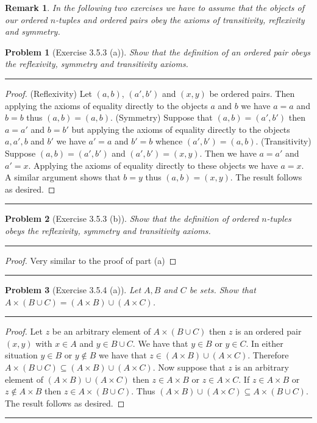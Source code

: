 \documentclass{article}
\newcommand{\lined}{\noindent\rule{\textwidth}{1pt}}
\newtheorem*{problem}{Problem}
\newtheorem*{remark}{Remark}
\begin{document}
	\newpage
	
	\begin{remark}
		In the following two exercises we have to assume that the objects of our ordered $n$-tuples and ordered pairs
		obey the axioms of transitivity, reflexivity and symmetry.  
	\end{remark}
	
	\begin{problem}[Exercise 3.5.3 (a)]
		Show that the definition of an ordered pair obeys the reflexivity, symmetry and transitivity axioms.
	\end{problem}
	
	\lined
	\begin{proof}
		(Reflexivity) Let $(a,b)$, $(a',b')$ and $(x,y)$ be ordered pairs. Then applying the axioms of equality directly to the objects $a$ and $b$ we have $a = a$ and $b = b$ thus $(a,b) = (a,b)$. (Symmetry) Suppose that $(a,b) = (a',b')$ then $a = a'$ and $b = b'$ but applying the axioms of equality directly to the objects $a,a',b$ and $b'$ we have $a' = a$ and $b' = b$ whence 
		$(a',b') = (a,b)$. (Transitivity) Suppose $(a,b) = (a',b')$ and $(a',b') = (x,y)$. Then we have $a = a'$ and $a' = x$. Applying the axioms of equality directly to these objects we have $a = x$. A similar argument shows that $b = y$ thus $(a,b) = (x,y)$. The result follows as desired.
		
	\end{proof}
	\lined
	
	\newpage
	
	\begin{problem}[Exercise 3.5.3 (b)]
		Show that the definition of ordered $n$-tuples obeys the reflexivity, symmetry and transitivity axioms.
	\end{problem}
	
	\lined
	\begin{proof}
		Very similar to the proof of part (a)
	\end{proof}
	\lined
	
	\newpage
	
	\begin{problem}[Exercise 3.5.4 (a)]
		Let $A,B$ and $C$ be sets. Show that $A \times (B \cup C) = (A \times B) \cup (A \times C)$.
	\end{problem}
	
	\lined
	\begin{proof}
		Let $z$ be an arbitrary element of $A \times (B \cup C)$ then $z$ is an ordered pair $(x,y)$ with $x \in A$ and 
		$y \in B \cup C$. We have that $y \in B$ or $y \in C$. In either situation $y \in B$ or $y \notin B$ we have that $z \in 
		(A \times B) \cup (A \times C)$. Therefore $A \times (B \cup C) \subseteq (A \times B) \cup (A \times C)$. Now suppose that $z$ is an arbitrary element of  $(A \times B) \cup (A \times C)$ then $z \in A \times B$ or $z \in A \times C$. If $z \in A \times B$ or $z \notin A \times B$  then $z \in A \times (B \cup C)$. Thus $(A \times B) \cup (A \times C) \subseteq A \times (B \cup C)$. The result follows as desired.
	\end{proof}
	\lined
	
\end{document}
